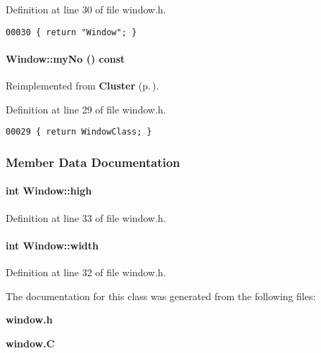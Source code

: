 Definition at line 30 of file window.h.\small\begin{verbatim}00030 { return "Window"; }
\end{verbatim}\normalsize 
\label{Window_a2}
\paragraph{ Window::my\-No () const\hspace{0.3cm}{\tt  [inline, virtual]}}\hfill



Reimplemented from {\bf Cluster} {\rm (p.\,\pageref{Cluster_a3})}.

Definition at line 29 of file window.h.\small\begin{verbatim}00029 { return WindowClass; }
\end{verbatim}\normalsize 


\subsubsection{Member Data Documentation}
\label{Window_m1}
\paragraph{\setlength{\rightskip}{0pt plus 5cm}int Window::high}\hfill



Definition at line 33 of file window.h.\label{Window_m0}
\paragraph{\setlength{\rightskip}{0pt plus 5cm}int Window::width}\hfill



Definition at line 32 of file window.h.

The documentation for this class was generated from the following files:\begin{CompactItemize}
\item 
{\bf window.h}\item 
{\bf window.C}\end{CompactItemize}
